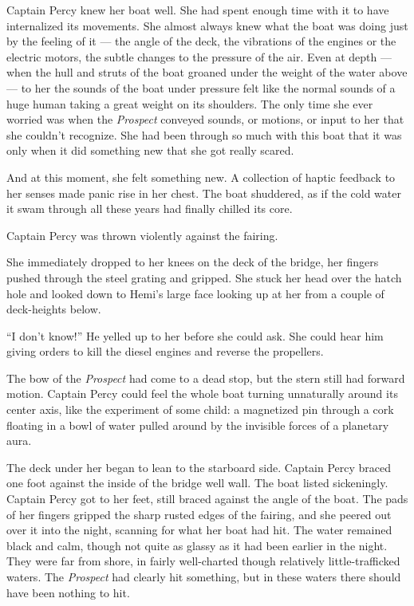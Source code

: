 \documentclass[
]{scrbook}
\begin{document}
Captain Percy knew her boat well. She had spent enough time with it to
have internalized its movements. She almost always knew what the boat
was doing just by the feeling of it --- the angle of the deck, the
vibrations of the engines or the electric motors, the subtle changes to
the pressure of the air. Even at depth --- when the hull and struts of
the boat groaned under the weight of the water above --- to her the
sounds of the boat under pressure felt like the normal sounds of a huge
human taking a great weight on its shoulders. The only time she ever
worried was when the \emph{Prospect} conveyed sounds, or motions, or
input to her that she couldn't recognize. She had been through so much
with this boat that it was only when it did something new that she got
really scared.

And at this moment, she felt something new. A collection of haptic
feedback to her senses made panic rise in her chest. The boat shuddered,
as if the cold water it swam through all these years had finally chilled
its core.

Captain Percy was thrown violently against the fairing.

She immediately dropped to her knees on the deck of the bridge, her
fingers pushed through the steel grating and gripped. She stuck her head
over the hatch hole and looked down to Hemi's large face looking up at
her from a couple of deck-heights below.

``I don't know!'' He yelled up to her before she could ask. She could
hear him giving orders to kill the diesel engines and reverse the
propellers.

The bow of the \emph{Prospect} had come to a dead stop, but the stern
still had forward motion. Captain Percy could feel the whole boat
turning unnaturally around its center axis, like the experiment of some
child: a magnetized pin through a cork floating in a bowl of water
pulled around by the invisible forces of a planetary aura.

The deck under her began to lean to the starboard side. Captain Percy
braced one foot against the inside of the bridge well wall. The boat
listed sickeningly. Captain Percy got to her feet, still braced against
the angle of the boat. The pads of her fingers gripped the sharp rusted
edges of the fairing, and she peered out over it into the night,
scanning for what her boat had hit. The water remained black and calm,
though not quite as glassy as it had been earlier in the night. They
were far from shore, in fairly well-charted though relatively
little-trafficked waters. The \emph{Prospect} had clearly hit something,
but in these waters there should have been nothing to hit.
\end{document}
